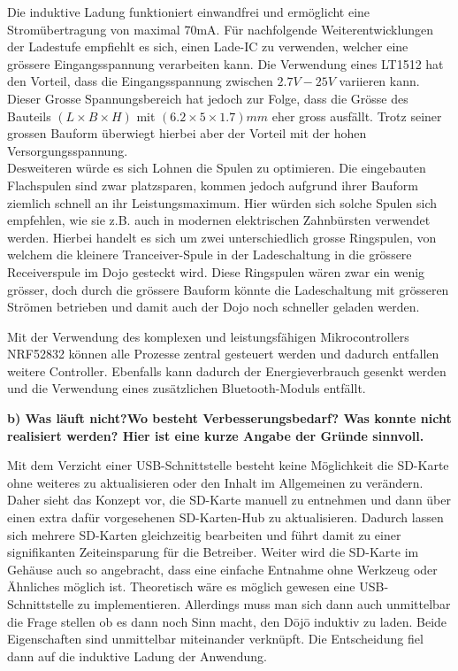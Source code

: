 Die induktive Ladung funktioniert einwandfrei und ermöglicht eine Stromübertragung von maximal 70mA. Für nachfolgende Weiterentwicklungen der Ladestufe empfiehlt es sich, einen Lade-IC zu verwenden, welcher eine grössere Eingangsspannung verarbeiten kann. Die Verwendung eines LT1512 hat den Vorteil, dass die Eingangsspannung zwischen $2.7V - 25V$ variieren kann. Dieser Grosse Spannungsbereich hat jedoch zur Folge, dass die Grösse des Bauteils $(L \times B \times H)$ mit $(6.2\times 5\times 1.7)mm$ eher gross ausfällt. Trotz seiner grossen Bauform überwiegt hierbei aber der Vorteil mit der hohen Versorgungsspannung.\\
Desweiteren würde es sich Lohnen die Spulen zu optimieren. Die eingebauten Flachspulen sind zwar platzsparen, kommen jedoch aufgrund ihrer Bauform ziemlich schnell an ihr Leistungsmaximum. Hier würden sich solche Spulen sich empfehlen, wie sie z.B. auch in modernen elektrischen Zahnbürsten verwendet werden. Hierbei handelt es sich um zwei unterschiedlich grosse Ringspulen, von welchem die kleinere Tranceiver-Spule in der Ladeschaltung in die grössere Receiverspule  im Dojo gesteckt wird. Diese Ringspulen wären zwar ein wenig grösser, doch durch die grössere Bauform könnte die Ladeschaltung mit grösseren Strömen betrieben und damit auch der Dojo noch schneller geladen werden.
 
Mit der Verwendung des komplexen und leistungsfähigen Mikrocontrollers NRF52832 können alle Prozesse zentral gesteuert werden und dadurch entfallen weitere Controller. Ebenfalls kann dadurch der Energieverbrauch gesenkt werden und die Verwendung eines zusätzlichen Bluetooth-Moduls entfällt.
 
\textbf{b) Was läuft nicht?Wo besteht Verbesserungsbedarf? Was konnte nicht realisiert werden? Hier ist eine kurze Angabe der Gründe sinnvoll.}
 
Mit dem Verzicht einer USB-Schnittstelle besteht keine Möglichkeit die SD-Karte ohne weiteres zu aktualisieren oder den Inhalt im Allgemeinen zu verändern. Daher sieht das Konzept vor, die SD-Karte manuell zu entnehmen und dann über einen extra dafür vorgesehenen SD-Karten-Hub zu aktualisieren. Dadurch lassen sich mehrere SD-Karten gleichzeitig bearbeiten und führt damit zu einer signifikanten Zeiteinsparung für die Betreiber. Weiter wird die SD-Karte im Gehäuse auch so angebracht, dass eine einfache Entnahme ohne Werkzeug oder Ähnliches möglich ist. Theoretisch wäre es möglich gewesen eine USB-Schnittstelle zu implementieren. Allerdings muss man sich dann auch unmittelbar die Frage stellen ob es dann noch Sinn macht, den Dōjō induktiv zu laden. Beide Eigenschaften sind unmittelbar miteinander verknüpft. Die Entscheidung fiel dann auf die induktive Ladung der Anwendung.
 
